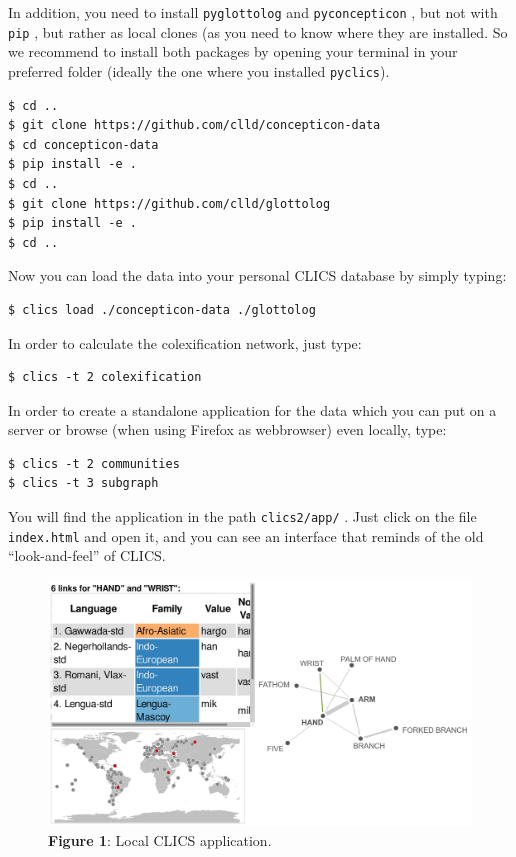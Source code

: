 \documentclass[
  a4paper,
  14pt,
  oneside,
  tablecaptionabove
]{scrbook}
\begin{document}
In addition, you need to install \lstinline!pyglottolog! and
\lstinline!pyconcepticon! , but not with \lstinline!pip! , but rather as
local clones (as you need to know where they are installed. So we
recommend to install both packages by opening your terminal in your
preferred folder (ideally the one where you installed
\lstinline!pyclics!).

\begin{lstlisting}
$ cd ..
$ git clone https://github.com/clld/concepticon-data
$ cd concepticon-data
$ pip install -e .
$ cd ..
$ git clone https://github.com/clld/glottolog
$ pip install -e .
$ cd ..
\end{lstlisting}

Now you can load the data into your personal CLICS database by simply
typing:

\begin{lstlisting}
$ clics load ./concepticon-data ./glottolog
\end{lstlisting}

In order to calculate the colexification network, just type:

\begin{lstlisting}
$ clics -t 2 colexification
\end{lstlisting}

In order to create a standalone application for the data which you can
put on a server or browse (when using Firefox as webbrowser) even
locally, type:

\begin{lstlisting}
$ clics -t 2 communities
$ clics -t 3 subgraph
\end{lstlisting}

You will find the application in the path \lstinline!clics2/app/! . Just
click on the file \lstinline!index.html! and open it, and you can see an
interface that reminds of the old \enquote{look-and-feel} of CLICS.

\begin{figure}[htb]
\centering
\includegraphics[width=\textwidth]{images/clics-local.png}
\captionsetup{justification=centering}
\caption*{\small \textbf{Figure 1}: Local CLICS application.}
\end{figure}
\end{document}
